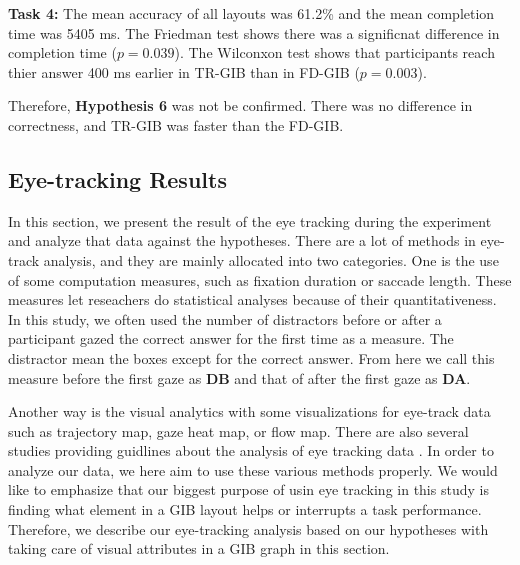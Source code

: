 \documentclass{vgtc}                          %
\begin{document}
{\bf Task 4:} The mean accuracy of all layouts was 61.2\% and the mean completion time was 5405 ms.
The Friedman test shows there was a significnat difference in completion time ($p = 0.039$).
The Wilconxon test shows that participants reach thier answer 400 ms earlier in TR-GIB than in FD-GIB ($p=0.003$).

Therefore, {\bf Hypothesis 6} was not be confirmed. There was no difference in correctness, and TR-GIB was faster than the FD-GIB.



\subsection{Eye-tracking Results}
In this section, we present the result of the eye tracking during the experiment and analyze that data against the hypotheses.
There are a lot of methods in eye-track analysis, and they are mainly allocated into two categories. One is the use of some computation measures, such as fixation duration or saccade length.
These measures let reseachers do statistical analyses because of their quantitativeness.
In this study, we often used the number of distractors before or after a participant gazed the correct answer for the first time as a measure.
The distractor mean the boxes except for the correct answer.
From here we call this measure before the first gaze as {\bf DB} and that of after the first gaze as {\bf DA}.

Another way is the visual analytics with some visualizations for eye-track data such as trajectory map, gaze heat map, or flow map.
There are also several studies providing guidlines about the analysis of eye tracking data \cite{andrienko2012visual,duchowski2007eye,kurzhals2014evaluating}. In order to analyze our data, we here aim to use these various methods properly. We would like to emphasize that our biggest purpose of usin eye tracking in this study is finding what element in a GIB layout helps or interrupts a task performance. Therefore, we describe our eye-tracking analysis based on our hypotheses with taking care of visual attributes in a GIB graph in this section.
\end{document}
